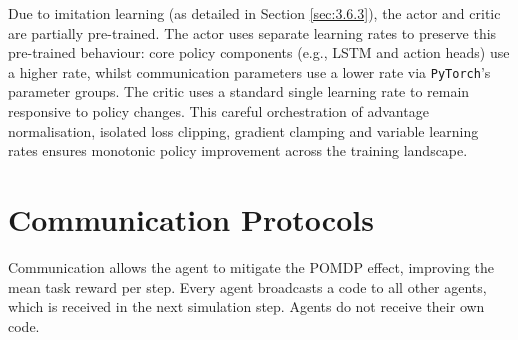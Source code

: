 
Due to imitation learning (as detailed in Section \ref{sec:3.6.3}), the actor and critic are partially pre-trained.
The actor uses separate learning rates to preserve this pre-trained behaviour: core policy components (e.g., LSTM and action heads) use a higher rate, whilst communication parameters use a lower rate via \lstinline[language=Python]|PyTorch|'s parameter groups.
The critic uses a standard single learning rate to remain responsive to policy changes.
This careful orchestration of advantage normalisation, isolated loss clipping, gradient clamping and variable learning rates ensures monotonic policy improvement across the training landscape.


\section{Communication Protocols}
\label{sec:3.4}

Communication allows the agent to mitigate the POMDP effect, improving the mean task reward per step.
Every agent broadcasts a code to all other agents, which is received in the next simulation step.
Agents do not receive their own code.

